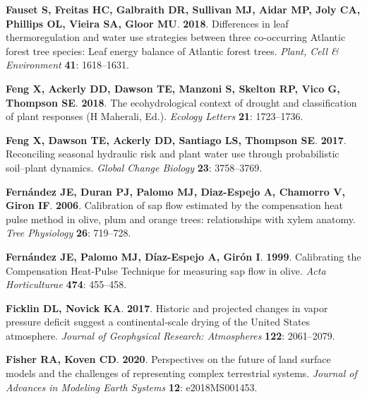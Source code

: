 \documentclass[11pt,twoside]{reedthesis}
\begin{document}
\hypertarget{ref-fauset_differences_2018}{}
\textbf{\textnormal{Fauset S}, \textnormal{Freitas HC},
\textnormal{Galbraith DR}, \textnormal{Sullivan MJ}, \textnormal{Aidar
MP}, \textnormal{Joly CA}, \textnormal{Phillips OL}, \textnormal{Vieira
SA}, \textnormal{Gloor MU}}. \textbf{2018}. Differences in leaf
thermoregulation and water use strategies between three co-occurring
Atlantic forest tree species: Leaf energy balance of Atlantic forest
trees. \emph{Plant, Cell \& Environment} \textbf{41}: 1618--1631.

\hypertarget{ref-feng_ecohydrological_2018}{}
\textbf{\textnormal{Feng X}, \textnormal{Ackerly DD}, \textnormal{Dawson
TE}, \textnormal{Manzoni S}, \textnormal{Skelton RP}, \textnormal{Vico
G}, \textnormal{Thompson SE}}. \textbf{2018}. The ecohydrological
context of drought and classification of plant responses (H Maherali,
Ed.). \emph{Ecology Letters} \textbf{21}: 1723--1736.

\hypertarget{ref-feng_reconciling_2017}{}
\textbf{\textnormal{Feng X}, \textnormal{Dawson TE}, \textnormal{Ackerly
DD}, \textnormal{Santiago LS}, \textnormal{Thompson SE}}. \textbf{2017}.
Reconciling seasonal hydraulic risk and plant water use through
probabilistic soil--plant dynamics. \emph{Global Change Biology}
\textbf{23}: 3758--3769.

\hypertarget{ref-Fernandez2006}{}
\textbf{\textnormal{Fernández JE}, \textnormal{Duran PJ},
\textnormal{Palomo MJ}, \textnormal{Diaz-Espejo A}, \textnormal{Chamorro
V}, \textnormal{Giron IF}}. \textbf{2006}. Calibration of sap flow
estimated by the compensation heat pulse method in olive, plum and
orange trees: relationships with xylem anatomy. \emph{Tree Physiology}
\textbf{26}: 719--728.

\hypertarget{ref-Fernandez1999}{}
\textbf{\textnormal{Fernández JE}, \textnormal{Palomo MJ},
\textnormal{Díaz-Espejo A}, \textnormal{Girón I}}. \textbf{1999}.
Calibrating the Compensation Heat-Pulse Technique for measuring sap flow
in olive. \emph{Acta Horticulturae} \textbf{474}: 455--458.

\hypertarget{ref-ficklin_historic_2017}{}
\textbf{\textnormal{Ficklin DL}, \textnormal{Novick KA}}. \textbf{2017}.
Historic and projected changes in vapor pressure deficit suggest a
continental‐scale drying of the United States atmosphere. \emph{Journal
of Geophysical Research: Atmospheres} \textbf{122}: 2061--2079.

\hypertarget{ref-Fisher2020}{}
\textbf{\textnormal{Fisher RA}, \textnormal{Koven CD}}. \textbf{2020}.
Perspectives on the future of land surface models and the challenges of
representing complex terrestrial systems. \emph{Journal of Advances in
Modeling Earth Systems} \textbf{12}: e2018MS001453.
\end{document}
